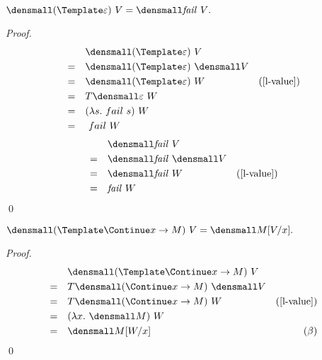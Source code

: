 \begin{lemma}
  \label{thm:templ-fail}
  $ \den{(\Template \varepsilon) ~ V} = \den{\mathit{fail}~V}.$
\end{lemma}
    \begin{proof}
        \begin{align*}
            &\quad \den{(\Template \varepsilon) ~ V} \\
            =& \quad \den{(\Template \varepsilon)} ~ \den{V}\\
            =& \quad \den{(\Template \varepsilon)} ~ W & (\cref{l-value})\\
            =& \quad T\den{\varepsilon} ~ W \\
            =& \quad (\lambda s. ~fail ~s) ~ W \\
            =& \quad ~fail ~W 
        \end{align*}
        \begin{align*}
            &\quad \den{\mathit{fail}~V} \\
            =& \quad \den{\mathit{fail}} ~\den{V}\\
            =& \quad \den{\mathit{fail}} ~W  & (\cref{l-value})\\
            =& \quad \mathit{fail} ~W
        \end{align*}
        \qed
    \end{proof}

\begin{lemma}
  \label{thm:templ-continue}
  $ \den{(\Template \Continue x \to M) ~ V} = \den{M\subst{x}{V}}.$
\end{lemma}
    \begin{proof}
        \begin{align*}
            &\quad \den{(\Template \Continue x \to M) ~ V} \\
            =& \quad T\den{(\Continue x \to M)} ~ \den{V}\\
            =& \quad T\den{(\Continue x \to M)} ~ W & (\cref{l-value})\\
            =& \quad (\lambda x. ~\den{M}) ~ W \\
            =& \quad \den{M}\subst{x}{W} & (\beta)
        \end{align*}
        \qed
    \end{proof}


